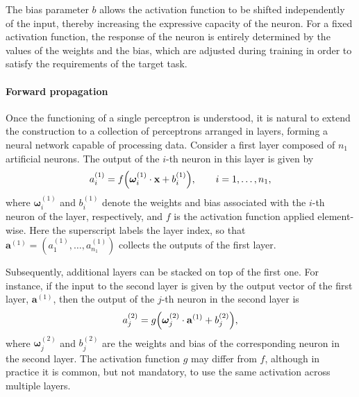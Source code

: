 The bias parameter $b$ allows the activation function to be shifted independently of the input, thereby increasing the expressive capacity of the neuron. For a fixed activation function, the response of the neuron is entirely determined by the values of the weights and the bias, which are adjusted during training in order to satisfy the requirements of the target task.

\paragraph{Forward propagation}
Once the functioning of a single perceptron is understood, it is natural to extend the construction to a collection of perceptrons arranged in layers, forming a neural network capable of processing data. Consider a first layer composed of $n_1$ artificial neurons. The output of the $i$-th neuron in this layer is given by
\begin{equation}
    \label{eq:layer_1}
    a^{(1)}_i = f\qty( \boldsymbol{\omega}^{(1)}_i \cdot \mathbf{x} + b^{(1)}_i ),
    \qquad i = 1,\dots,n_1,
\end{equation}
where $\boldsymbol{\omega}^{(1)}_i$ and $b^{(1)}_i$ denote the weights and bias associated with the $i$-th neuron of the layer, respectively, and $f$ is the activation function applied element-wise. Here the superscript labels the layer index, so that $\mathbf{a}^{(1)} = (a^{(1)}_1,\dots,a^{(1)}_{n_1})$ collects the outputs of the first layer.

Subsequently, additional layers can be stacked on top of the first one. For instance, if the input to the second layer is given by the output vector of the first layer, $\mathbf{a}^{(1)}$, then the output of the $j$-th neuron in the second layer is
\begin{equation}
    a^{(2)}_j = g \qty( \boldsymbol{\omega}^{(2)}_j \cdot \mathbf{a}^{(1)} + b^{(2)}_j ),
\end{equation}
where $\boldsymbol{\omega}^{(2)}_j$ and $b^{(2)}_j$ are the weights and bias of the corresponding neuron in the second layer. The activation function $g$ may differ from $f$, although in practice it is common, but not mandatory, to use the same activation across multiple layers.

